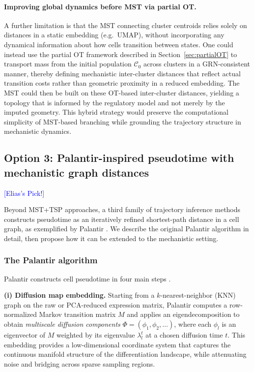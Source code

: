 \documentclass[10pt]{article}
\begin{document}
\paragraph{Improving global dynamics before MST via partial OT.}
A further limitation is that the MST connecting cluster centroids relies solely on
distances in a static embedding (e.g.\ UMAP), without incorporating any dynamical
information about how cells transition between states.  One could instead use the
partial OT framework described in Section~\ref{sec:partialOT} to transport mass
from the initial population $\mathcal{C}_0$ across clusters in a GRN-consistent
manner, thereby defining mechanistic inter-cluster distances that reflect actual
transition costs rather than geometric proximity in a reduced embedding.  The MST
could then be built on these OT-based inter-cluster distances, yielding a topology
that is informed by the regulatory model and not merely by the imputed geometry.
This hybrid strategy would preserve the computational simplicity of MST-based
branching while grounding the trajectory structure in mechanistic dynamics.

\subsection{Option 3: Palantir-inspired pseudotime with mechanistic graph distances}
\label{sec:palantir}

\textcolor{blue}{[Elias's Pick!]}

Beyond MST+TSP approaches, a third family of trajectory inference methods constructs
pseudotime as an iteratively refined shortest-path distance in a cell graph, as
exemplified by Palantir \cite{Setty2019}.  We describe the original Palantir
algorithm in detail, then propose how it can be extended to the mechanistic setting.

\subsubsection{The Palantir algorithm}

Palantir constructs cell pseudotime in four main steps \cite{Setty2019}.

\textbf{(i) Diffusion map embedding.}
Starting from a $k$-nearest-neighbor (KNN) graph on the raw or PCA-reduced expression
matrix, Palantir computes a row-normalized Markov transition matrix $M$ and applies
an eigendecomposition to obtain \emph{multiscale diffusion components}
$\Phi = (\phi_1,\phi_2,\dots)$, where each $\phi_l$ is an eigenvector of $M$ weighted
by its eigenvalue $\lambda_l^t$ at a chosen diffusion time $t$.  This embedding
provides a low-dimensional coordinate system that captures the continuous manifold
structure of the differentiation landscape, while attenuating noise and bridging
across sparse sampling regions.
\end{document}
